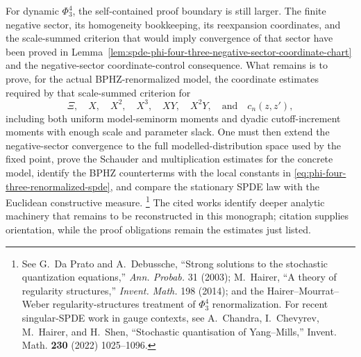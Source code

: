 For dynamic \(\Phi^4_3\), the self-contained proof boundary is still larger.
The finite negative sector, its homogeneity bookkeeping, its reexpansion
coordinates, and the scale-summed criterion that would imply convergence of
that sector have been proved in
Lemma~\ref{lem:spde-phi-four-three-negative-sector-coordinate-chart}
and
the negative-sector coordinate-control consequence.
What remains is to prove, for the actual BPHZ-renormalized model, the
coordinate estimates required by that scale-summed criterion for
\[
  \Xi,\quad X,\quad X^2,\quad X^3,\quad XY,\quad X^2Y,
  \quad\text{and}\quad c_n(z,z'),
\]
including both uniform model-seminorm moments and dyadic cutoff-increment
moments with enough scale and parameter slack.  One must then extend the
negative-sector convergence to the full modelled-distribution space used by
the fixed point, prove the Schauder and multiplication estimates for the
concrete model, identify the BPHZ counterterms with the local constants in
\eqref{eq:phi-four-three-renormalized-spde}, and compare the stationary SPDE
law with the Euclidean constructive measure.
\footnote{See G.~Da Prato and A.~Debussche, ``Strong solutions to the
stochastic quantization equations,'' \emph{Ann. Probab.} 31 (2003);
M.~Hairer, ``A theory of regularity structures,'' \emph{Invent. Math.} 198
(2014); and the Hairer--Mourrat--Weber regularity-structures treatment of
\(\Phi^4_3\) renormalization.  For recent singular-SPDE work in gauge
contexts, see A.~Chandra, I.~Chevyrev, M.~Hairer, and H.~Shen, ``Stochastic
quantisation of Yang--Mills,'' Invent. Math. \textbf{230} (2022)
1025--1096.}
The cited works identify deeper analytic machinery that remains to be
reconstructed in this monograph; citation supplies orientation, while the
proof obligations remain the estimates just listed.

